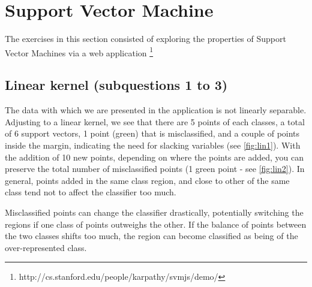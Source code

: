 \documentclass[11pt, a4paper]{article}
\begin{document}
\section{Support Vector Machine}

The exercises in this section consisted of exploring the properties of
Support Vector Machines via a web application
\footnote{http://cs.stanford.edu/people/karpathy/svmjs/demo/}

\subsection{Linear kernel (subquestions 1 to 3)}
The data with which we are presented in the application is not
linearly separable. Adjusting to a linear kernel, we see that there
are 5 points of each classes, a total of 6 support vectors, 1 point
(green) that is misclassified, and a couple of points inside the
margin, indicating the need for slacking variables (see
\ref{fig:lin1}). With the addition of 10 new points, depending on
where the points are added, you can preserve the total number of
misclassified points (1 green point - see \ref{fig:lin2}). In general,
points added in the same class region, and close to other of the same
class tend not to affect the classifier too much.

Misclassified points can change the classifier drastically,
potentially switching the regions if one class of points outweighs the
other. If the balance of points between the two classes shifts too
much, the region can become classified as being of the
over-represented class.
\end{document}
